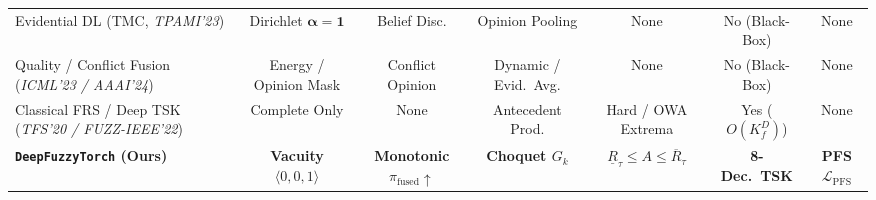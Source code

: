 \documentclass[10pt,twocolumn]{article}
\begin{document}
\begin{table}[t]
{\begin{tabular}{@{}>{\raggedright\arraybackslash}p{3.5cm}cccccc@{}}
Evidential DL (TMC, \textit{TPAMI'23}) \cite{han2022trusted,shao2024dual} & Dirichlet
$\bm{\alpha}=\mathbf{1}$ & Belief Disc. & Opinion Pooling & None & No (Black-Box) & None \\
Quality / Conflict Fusion (\textit{ICML'23 / AAAI'24}) \cite{zhang2023provable,xu2024reliable}
& Energy / Opinion Mask & Conflict Opinion & Dynamic / Evid.\ Avg. & None & No (Black-Box) &
None \\
Classical FRS / Deep TSK (\textit{TFS'20 / FUZZ-IEEE'22})
\cite{jensen2004fuzzy,wu2020optimize,lenz2022fuzzyroughlearn} & Complete Only & None &
Antecedent Prod. & Hard / OWA Extrema & Yes ($O(K_f^D)$) & None \\
\midrule
\textbf{\texttt{DeepFuzzyTorch} (Ours)} & \textbf{Vacuity $\langle 0,0,1\rangle$} &
\textbf{Monotonic $\pi_{\text{fused}}\uparrow$} & \textbf{Choquet $G_k$} &
\textbf{$\underline{R}_\tau \le A \le \overline{R}_\tau$} & \textbf{8-Dec.\ TSK} & \textbf{PFS
$\mathcal{L}_{\text{PFS}}$} \\
\bottomrule
\end{tabular}%
}
\end{table}
\end{document}
